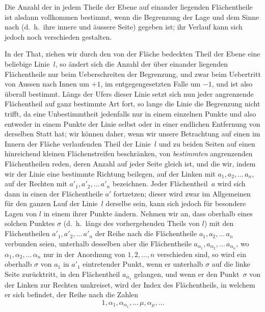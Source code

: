 \documentclass[a4paper,12pt]{article}
\begin{document}
Die Anzahl der in jedem Theile der Ebene auf einander liegenden
Fl\"{a}chentheile ist alsdann vollkommen bestimmt, wenn die
Begrenzung der Lage und dem Sinne nach (d.~h.\ ihre innere und
\"{a}ussere Seite) gegeben ist; ihr Verlauf kann sich jedoch noch
verschieden gestalten.

In der That, ziehen wir durch den von der Fl\"{a}che bedeckten
Theil der Ebene eine beliebige Linie~$l$, so \"{a}ndert sich die
Anzahl der \"{u}ber einander liegenden Fl\"{a}chentheile nur beim
Ueberschreiten der Begrenzung, und zwar beim Uebertritt von
Aussen nach Innen um $+1$, im entgegengesetzten Falle um $-1$,
und ist also \"{u}berall bestimmt.  L\"{a}ngs der Ufers dieser
Linie setzt sich nun jeder angrenzende Fl\"{a}chentheil auf ganz
bestimmte Art fort, so lange die Linie die Begrenzung nicht
trifft, da eine Unbestimmtheit jedenfalls nur in einem einzelnen
Punkte und also entweder in einem Punkte der Linie selbst oder in
einer endlichen Entfernung von derselben Statt hat; wir
k\"{o}nnen daher, wenn wir unsere Betrachtung auf einen im Innern
der Fl\"{a}che verlaufenden Theil der Linie~$l$ und zu beiden
Seiten auf einen hinreichend kleinen Fl\"{a}chenstreifen
beschr\"{a}nken, von \emph{bestimmten} angrenzenden
Fl\"{a}chentheilen reden, deren Anzahl auf jeder Seite gleich
ist, und die wir, indem wir der Linie eine bestimmte Richtung
beilegen, auf der Linken mit $a_1, a_2,\ldots\, a_n$, auf der
Rechten mit $a'_1, a'_2,\ldots\, a'_n$ bezeichnen.  Jeder
Fl\"{a}chentheil~$a$ wird sich dann in einen der
Fl\"{a}chentheile $a'$ fortzetzen; dieser wird zwar im
Allgemeinen f\"{u}r den ganzen Lauf der Linie~$l$ derselbe sein,
kann sich jedoch f\"{u}r besondere Lagen von $l$ in einem ihrer
Punkte \"{a}ndern.  Nehmen wir an, dass oberhalb eines solchen
Punktes $\sigma$ (d.~h.\ l\"{a}ngs des vorhergehenden Theils von
$l$) mit den Fl\"{a}chentheilen $a'_1, a'_2,\ldots\, a'_n$ der
Reihe nach die Fl\"{a}chentheile $a_1, a_2,\ldots\, a_n$
verbunden seien, unterhalb desselben aber die Fl\"{a}chentheile
$a_{\alpha_1}, a_{\alpha_2},\ldots\, a_{\alpha_n}$,
wo $\alpha_1, \alpha_2,\ldots\, \alpha_n$ nur in der Anordnung
von $1,2,\ldots,n$ verschieden sind, so wird ein oberhalb
$\sigma$ von $a_1$ in $a'_1$ eintretender Punkt, wenn er
unterhalb $\sigma$ auf die linke Seite zur\"{u}cktritt, in den
Fl\"{a}chentheil $a_{\alpha_1}$ gelangen, und wenn er den
Punkt~$\sigma$ von der Linken zur Rechten umkreiset, wird der
Index des Fl\"{a}chentheils, in welchem er sich befindet, der
Reihe nach die Zahlen
\[ 1, \alpha_1, \alpha_{\alpha_1},\ldots\, \mu, \alpha_\mu,\ldots \]
\end{document}
